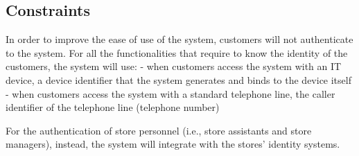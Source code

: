 \documentclass[../../main.tex]{subfiles}
\begin{document}
\subsection{Constraints}

In order to improve the ease of use of the system, customers will not authenticate to the system. For all the functionalities that require to know the identity of the customers, the system will use:
- when customers access the system with an IT device, a device identifier that the system generates and binds to the device itself
- when customers access the system with a standard telephone line, the caller identifier of the telephone line (telephone number)

For the authentication of store personnel (i.e., store assistants and store managers), instead, the system will integrate with the stores' identity systems.
\end{document}
